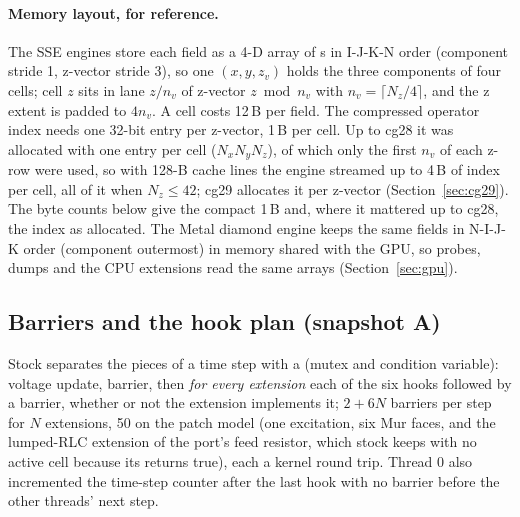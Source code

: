 \paragraph{Memory layout, for reference.} The SSE engines store each field as a 4-D array of s in
I-J-K-N order (component stride 1, z-vector stride 3), so one $(x,y,z_v)$ holds the three components of four cells;
cell $z$ sits in lane $z/n_v$ of z-vector $z \bmod n_v$ with $n_v=\lceil N_z/4\rceil$, and the z extent is padded to
$4n_v$. A cell costs 12\,B per field. The compressed operator index needs one 32-bit entry per z-vector, 1\,B per
cell. Up to cg28 it was allocated with one entry per cell ($N_x N_y N_z$), of which only the first $n_v$ of each z-row
were used, so with 128-B cache lines the engine streamed up to 4\,B of index per cell, all of it when $N_z \le 42$;
cg29 allocates it per z-vector (Section~\ref{sec:cg29}). The byte counts below give the compact 1\,B and, where it
mattered up to cg28, the index as allocated. The Metal diamond engine keeps the same  fields in N-I-J-K
order (component outermost) in memory shared with the GPU, so probes, dumps and the CPU extensions read the same arrays
(Section~\ref{sec:gpu}).

\subsection{Barriers and the hook plan (snapshot A)}
Stock  separates the pieces of a time step with a  (mutex and
condition variable): voltage update, barrier, then \emph{for every extension} each of the six hooks followed by a
barrier, whether or not the extension implements it; $2+6N$ barriers per step for $N$ extensions, 50 on the patch
model (one excitation, six Mur faces, and the lumped-RLC extension of the port's feed resistor, which stock keeps with
no active cell because its  returns true), each a kernel round trip. Thread 0 also incremented
the time-step counter after the last hook with no barrier before the other threads' next step.

